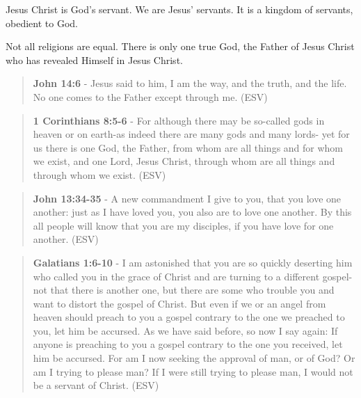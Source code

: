 \documentclass[11pt]{article}
\begin{document}
Jesus Christ is God's servant. We are Jesus' servants. It is a kingdom of servants, obedient to God.

Not all religions are equal. There is only one true God, the Father of Jesus Christ who has revealed Himself in Jesus Christ.

\begin{quote}
\textbf{John 14:6} - Jesus said to him, I am the way, and the truth, and the life. No one comes to the Father except through me. (ESV)
\end{quote}

\begin{quote}
\textbf{1 Corinthians 8:5-6} - For although there may be so-called gods in heaven or on earth-as indeed there are many gods and many lords- yet for us there is one God, the Father, from whom are all things and for whom we exist, and one Lord, Jesus Christ, through whom are all things and through whom we exist. (ESV)
\end{quote}

\begin{quote}
\textbf{John 13:34-35} - A new commandment I give to you, that you love one another: just as I have loved you, you also are to love one another. By this all people will know that you are my disciples, if you have love for one another. (ESV)
\end{quote}

\begin{quote}
\textbf{Galatians 1:6-10} - I am astonished that you are so quickly deserting him who called you in the grace of Christ and are turning to a different gospel- not that there is another one, but there are some who trouble you and want to distort the gospel of Christ. But even if we or an angel from heaven should preach to you a gospel contrary to the one we preached to you, let him be accursed. As we have said before, so now I say again: If anyone is preaching to you a gospel contrary to the one you received, let him be accursed. For am I now seeking the approval of man, or of God? Or am I trying to please man? If I were still trying to please man, I would not be a servant of Christ. (ESV)
\end{quote}
\end{document}
